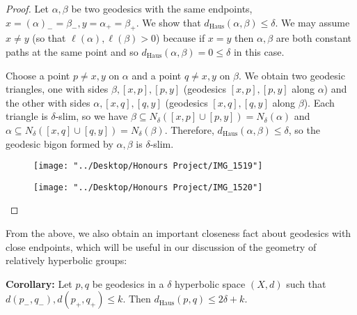 \documentclass[12pt]{article}
\newcommand{\vs}{\vskip10pt}
\begin{document}
	\begin{proof}
		
		Let $\alpha, \beta$ be two geodesics with the same endpoints, $x = (\alpha)_- = \beta_-, y = \alpha_+ = \beta_+$. We show that $d_{\text{Haus}}(\alpha, \beta) \leq \delta$. We may assume $x \neq y$ (so that $\ell(\alpha), \ell(\beta) > 0$) because if $x = y$ then $\alpha, \beta$ are both constant paths at the same point and so $d_{\text{Haus}}(\alpha, \beta) = 0 \leq \delta$ in this case. 
		
		\vs 
		
		Choose a point $p \neq x,y$ on $\alpha$ and a point $q \neq x,y$ on $\beta$. We  obtain two geodesic triangles, one with sides $\beta, [x,p], [p,y]$ (geodesics $[x,p], [p,y]$ along $\alpha$) and the other with sides $\alpha, [x, q], [q, y]$ (geodesics $ [x, q], [q, y]$ along $\beta$). Each triangle is $\delta$-slim, so we have $\beta \subseteq N_{\delta}([x,p] \cup [p, y]) = N_{\delta}(\alpha)$ and $\alpha \subseteq N_{\delta}([x,q] \cup [q, y]) = N_{\delta}(\beta)$. Therefore, $d_{\text{Haus}}(\alpha, \beta) \leq \delta$, so the geodesic bigon formed by $\alpha, \beta$ is $\delta$-slim. 
		
		
\begin{figure} [h]
	\centering
	\texttt{[image: "../Desktop/Honours Project/IMG\_1519"]}
	\caption{}
	\label{fig:img1519}
\end{figure}

\begin{figure} [h]
	\centering
	\texttt{[image: "../Desktop/Honours Project/IMG\_1520"]}
	\caption{}
	\label{fig:img1520}
\end{figure}

		
	\end{proof}
	
	
	From the above, we also obtain an important closeness fact about geodesics with close endpoints, which will be useful in our discussion of the geometry of relatively hyperbolic groups: 
	
	\vs 
	
	\textbf{Corollary: } Let $p,q$ be geodesics in a $\delta$ hyperbolic space $(X,d)$ such that $d(p_-, q_-), d(p_+, q_+) \leq k$. Then $d_{\text{Haus}}(p,q) \leq 2 \delta + k$. 
	
\end{document}
